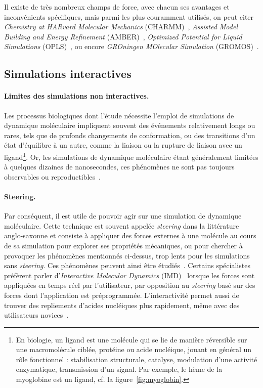 	
	Il existe de très nombreux champs de force, avec chacun ses avantages et inconvénients spécifiques, mais parmi les plus couramment utilisés, on peut citer \emph{Chemistry at HARvard Molecular Mechanics} (CHARMM)~\cite{brooks1983charmm, brooks2009charmm}, \emph{Assisted Model Building and Energy Refinement} (AMBER)~\cite{cornell1995second, wang2004development}, \emph{Optimized Potential for Liquid Simulations} (OPLS)~\cite{jorgensen1996development, kaminski2001evaluation}, ou encore \emph{GROningen MOlecular Simulation} (GROMOS)~\cite{scott1999gromos, oostenbrink2004biomolecular}.
	
    
	\subsection{Simulations interactives}
	\paragraph{Limites des simulations non interactives.}
	Les processus biologiques dont l'étude nécessite l'emploi de simulations de dynamique moléculaire impliquent souvent des événements relativement longs ou rares, tels que de profonds changements de conformation, ou des transitions d'un état d'équilibre à un autre, comme la liaison ou la rupture de liaison avec un ligand\footnote{En biologie, un ligand est une molécule qui se lie de manière réversible sur une macromolécule ciblée, protéine ou acide nucléique, jouant en général un rôle fonctionnel : stabilisation structurale, catalyse, modulation d'une activité enzymatique, transmission d'un signal. Par exemple, le hème de la myoglobine est un ligand, cf. la figure~\ref{fig:myoglobin}.}. Or, les simulations de dynamique moléculaire étant généralement limitées à quelques dizaines de nanosecondes, ces phénomènes ne sont pas toujours observables ou reproductibles~\cite{phillips2005scalable}.
	
	\paragraph{Steering.}
	Par conséquent, il est utile de pouvoir agir sur une simulation de dynamique moléculaire. Cette technique est souvent appelée \emph{steering} dans la littérature anglo-saxonne et consiste à appliquer des forces externes à une molécule au cours de sa simulation pour explorer ses propriétés mécaniques, ou pour chercher à provoquer les phénomènes mentionnés ci-dessus, trop lents pour les simulations sans \emph{steering}. Ces phénomènes peuvent ainsi être étudiés~\cite{izrailev1999steered, isralewitz2001steered, isralewitz2001steered}. Certains spécialistes~\cite{phillips2005scalable} préfèrent parler d'\emph{Interactive Molecular Dynamics} (IMD)~\cite{stone2001system, grayson2003mechanisms} lorsque les forces sont appliquées en temps réel par l'utilisateur, par opposition au \emph{steering} basé sur des forces dont l'application est préprogrammée. L'interactivité permet aussi de trouver des repliements d'acides nucléiques plus rapidement, même avec des utilisateurs novices~\cite{mazzanti2017can}.
	
